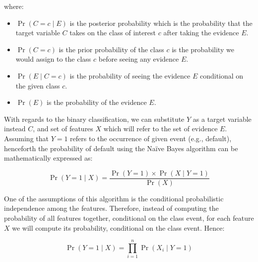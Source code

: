 where:
\begin{itemize}\setlength\itemsep{0em}
	\item $\operatorname{Pr}\left(C=c \mid E \right)$ is the posterior probability which is the probability that the target variable $C$ takes on the class of interest $c$ after taking the evidence $E$.
	\item $\operatorname{Pr}\left(C=c\right)$  is the prior probability of the class $c$ is the probability we would assign to the class $c$ before seeing any evidence $E$.
	\item $\operatorname{Pr}\left(E \mid C=c\right)$ is the probability of seeing the evidence $E$ conditional on the given class $c$.
	\item $\operatorname{Pr}\left(E\right)$ is the probability of the evidence $E$.
\end{itemize}

With regards to the binary classification, we can substitute $Y$ as a target variable instead $C$, and set of features $X$ which will refer to the set of evidence $E$.
Assuming that $Y=1$ refers to the occurrence of given event (e.g., default), henceforth the probability of default using the Naïve Bayes algorithm can be mathematically expressed as:

\begin{equation}\label{eq}
    \operatorname{Pr}\left(Y=1 \mid X \right) = \frac{\operatorname{Pr}\left(Y=1\right) \times \operatorname{Pr}\left(X \mid Y=1 \right)}{\operatorname{Pr}\left(X\right)}
\end{equation}

One of the assumptions of this algorithm is the conditional probabilistic independence among the features.
Therefore, instead of computing the probability of all features together, conditional on the class event, for each feature $X$ we will compute its probability, conditional on the class event. Hence:

\begin{equation}\label{eq}
    \operatorname{Pr}\left(Y=1 \mid X \right) = \prod_{i=1}^{n} \operatorname{Pr}\left(X_i \mid Y=1\right)
\end{equation}


